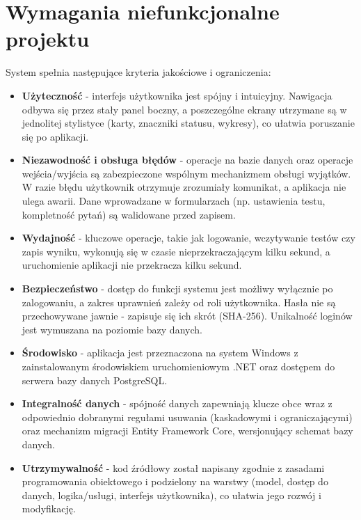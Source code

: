 \section{Wymagania niefunkcjonalne projektu}
\label{sec:wymaganiaNiefunkcjonalne}

System spełnia następujące kryteria jakościowe i ograniczenia:

\begin{itemize}
  \item \textbf{Użyteczność} - interfejs użytkownika jest spójny i intuicyjny. Nawigacja odbywa
        się przez stały panel boczny, a poszczególne ekrany utrzymane są w jednolitej stylistyce
        (karty, znaczniki statusu, wykresy), co ułatwia poruszanie się po aplikacji.

  \item \textbf{Niezawodność i obsługa błędów} - operacje na bazie danych oraz operacje
        wejścia/wyjścia są zabezpieczone wspólnym mechanizmem obsługi wyjątków. W razie błędu
        użytkownik otrzymuje zrozumiały komunikat, a aplikacja nie ulega awarii. Dane wprowadzane
        w formularzach (np. ustawienia testu, kompletność pytań) są walidowane przed zapisem.

  \item \textbf{Wydajność} - kluczowe operacje, takie jak logowanie, wczytywanie testów czy zapis
        wyniku, wykonują się w czasie nieprzekraczającym kilku sekund, a uruchomienie aplikacji
        nie przekracza kilku sekund.

  \item \textbf{Bezpieczeństwo} - dostęp do funkcji systemu jest możliwy wyłącznie po zalogowaniu,
        a zakres uprawnień zależy od roli użytkownika. Hasła nie są przechowywane jawnie - zapisuje
        się ich skrót (SHA-256). Unikalność loginów jest wymuszana na poziomie bazy danych.

  \item \textbf{Środowisko} - aplikacja jest przeznaczona na system Windows z zainstalowanym
        środowiskiem uruchomieniowym .NET oraz dostępem do serwera bazy danych PostgreSQL.

  \item \textbf{Integralność danych} - spójność danych zapewniają klucze obce wraz z odpowiednio
        dobranymi regułami usuwania (kaskadowymi i ograniczającymi) oraz mechanizm migracji
        Entity Framework Core, wersjonujący schemat bazy danych.

  \item \textbf{Utrzymywalność} - kod źródłowy został napisany zgodnie z zasadami programowania
        obiektowego i podzielony na warstwy (model, dostęp do danych, logika/usługi, interfejs
        użytkownika), co ułatwia jego rozwój i modyfikację.
\end{itemize}
